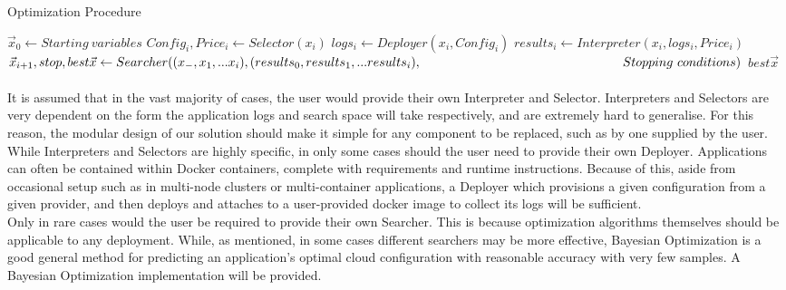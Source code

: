 \documentclass{report}
\begin{document}
\begin{algorithm}
\caption{Optimization Procedure}
\label{alg:Optimization}
\begin{algorithmic}
\State $\vec{x}_{0}\gets Starting \ variables$
\State $Config_i, Price_i\gets Selector(x_i)$
\State $logs_i \gets Deployer(x_i, Config_i)$
\State $results_i \gets Interpreter(x_i, logs_i, Price_i)$
\State $\vec{x}_{i+1}, stop, best\vec{x} \gets Searcher((x_-, x_1,...x_i), (results_0, results_1,...results_i),\newline
\hspace*{5.6cm}Stopping\ conditions)$
\State \Return $best\vec{x}$
\EndIf
\EndFor
\EndProcedure
\end{algorithmic}
\end{algorithm}
 

\paragraph{}
It is assumed that in the vast majority of cases, the user would provide their own Interpreter and Selector. Interpreters and Selectors are very dependent on the form the application logs and search space will take respectively, and are extremely hard to generalise. For this reason, the modular design of our solution should make it simple for any component to be replaced, such as by one supplied by the user.  \\
While Interpreters and Selectors are highly specific, in only some cases should the user need to provide their own Deployer. Applications can often be contained within Docker containers, complete with requirements and runtime instructions. Because of this, aside from occasional setup such as in multi-node clusters or multi-container applications, a Deployer which provisions a given configuration from a given provider, and then deploys and attaches to a user-provided docker image to collect its logs will be sufficient.  \\
Only in rare cases would the user be required to provide their own Searcher. This is because optimization algorithms themselves should be applicable to any deployment. While, as mentioned, in some cases different searchers may be more effective, Bayesian Optimization is a good general method for predicting an application's optimal cloud configuration with reasonable accuracy with very few samples. A Bayesian Optimization implementation will be provided.
\end{document}
